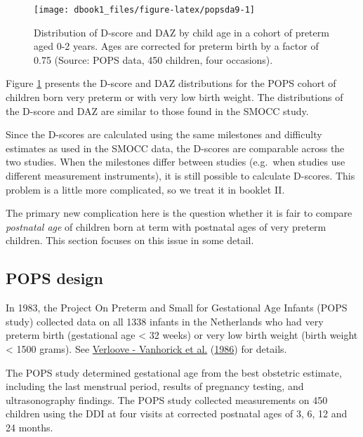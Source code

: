 \documentclass[
]{book}
\begin{document}
\begin{figure}

{\centering \texttt{[image: dbook1\_files/figure-latex/popsda9-1]} 

}

\caption{Distribution of D-score and DAZ by child age in a cohort of preterm aged 0-2 years. Ages are corrected for preterm birth by a factor of 0.75 (Source: POPS data, 450 children, four occasions).}\label{fig:popsda9}
\end{figure}



Figure \ref{fig:popsda9} presents the D-score and DAZ distributions for the POPS cohort of children born very preterm or with very low birth weight. The distributions of the D-score and DAZ are similar to those found in the SMOCC study.

Since the D-scores are calculated using the same milestones and difficulty estimates as used in the SMOCC data, the D-scores are comparable across the two studies. When the milestones differ between studies (e.g.~when studies use different measurement instruments), it is still possible to calculate D-scores. This problem is a little more complicated, so we treat it in booklet II.

The primary new complication here is the question whether it is fair to compare \emph{postnatal age} of children born at term with postnatal ages of very preterm children. This section focuses on this issue in some detail.

\hypertarget{pops-design}{%
\subsection{POPS design}\label{pops-design}}

In 1983, the Project On Preterm and Small for Gestational Age Infants (POPS study) collected data on all 1338 infants in the Netherlands who had very preterm birth (gestational age \textless{} 32 weeks) or very low birth weight (birth weight \textless{} 1500 grams). See \protect\hyperlink{ref-verloove1986}{Verloove - Vanhorick et al.} (\protect\hyperlink{ref-verloove1986}{1986}) for details.

The POPS study determined gestational age from the best obstetric estimate, including the last menstrual period, results of pregnancy testing, and ultrasonography findings. The POPS study collected measurements on 450 children using the DDI at four visits at corrected postnatal ages of 3, 6, 12 and 24 months.
\end{document}
